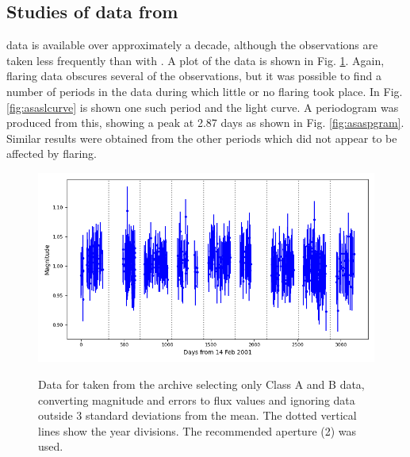 \subsection{Studies of data from {\asas}}
\protect\label{section:asas}

{\asas} data is available over approximately a decade, although the observations
are taken less frequently than with \ktwo. A plot of the data is shown in Fig.
\ref{fig:asasall}. Again, flaring data obscures several of the observations, but
it was possible to find a number of periods in the data during which little or no flaring took place. In Fig. \ref{fig:asaslcurve} is
shown one such period and the light curve. A periodogram was produced from this,
showing a peak at 2.87 days as shown in Fig. \ref{fig:asaspgram}. Similar
results were obtained from the other periods which did not appear to be affected
by flaring.

\begin{figure}[!htbp]
\begin{center}
\includegraphics[scale=0.40]{asas/images/asasall.png} \\
\vspace{-.5cm}
\end{center}   
\caption{Data for {\ross} taken from the {\asas} archive selecting only Class A
and B data, converting magnitude and errors to flux values and ignoring data
outside 3 standard deviations from the mean.
The dotted vertical lines show the year divisions. The recommended aperture (2) was used.}\protect\label{fig:asasall}
\end{figure}

